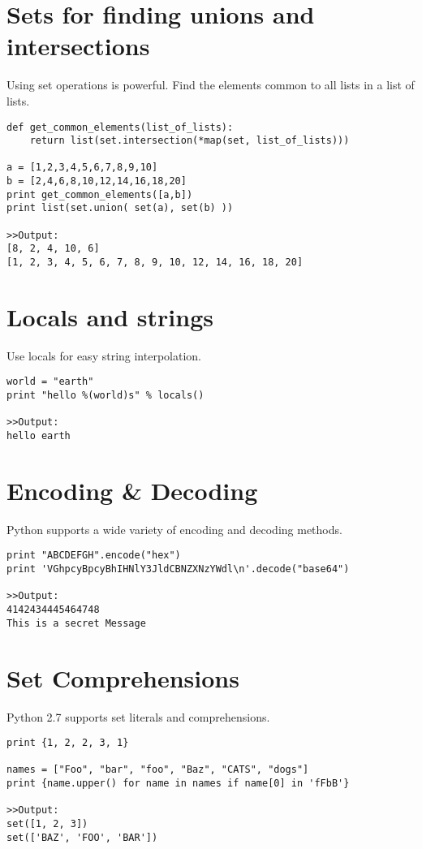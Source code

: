 \documentclass[12pt,a4paper,final,twoside,onecolumn,titlepage]{book}
\begin{document}
\section{Sets for finding unions and intersections}
Using set operations is powerful. Find the elements common to all lists in a list of lists.
\begin{lstlisting}
def get_common_elements(list_of_lists):
    return list(set.intersection(*map(set, list_of_lists)))

a = [1,2,3,4,5,6,7,8,9,10]
b = [2,4,6,8,10,12,14,16,18,20]
print get_common_elements([a,b])
print list(set.union( set(a), set(b) ))

>>Output:
[8, 2, 4, 10, 6]
[1, 2, 3, 4, 5, 6, 7, 8, 9, 10, 12, 14, 16, 18, 20]

\end{lstlisting}


\section{Locals and strings}
Use locals for easy string interpolation.

\begin{lstlisting}
world = "earth"
print "hello %(world)s" % locals()

>>Output:
hello earth

\end{lstlisting}


\section{Encoding \& Decoding}
Python supports a wide variety of encoding and decoding methods.
\begin{lstlisting}
print "ABCDEFGH".encode("hex")
print 'VGhpcyBpcyBhIHNlY3JldCBNZXNzYWdl\n'.decode("base64")

>>Output:
4142434445464748
This is a secret Message
\end{lstlisting}

\section{Set Comprehensions}
Python 2.7 supports set literals and comprehensions.

\begin{lstlisting}
print {1, 2, 2, 3, 1}

names = ["Foo", "bar", "foo", "Baz", "CATS", "dogs"]
print {name.upper() for name in names if name[0] in 'fFbB'}

>>Output:
set([1, 2, 3])
set(['BAZ', 'FOO', 'BAR'])
\end{lstlisting}
\end{document}
